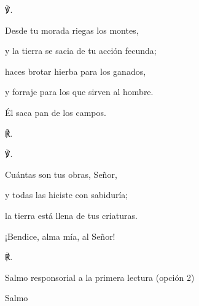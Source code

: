 			\begin{readbody}\begin{readred}℣.\end{readred} Desde tu morada riegas los montes, \end{readbody}
			
			\begin{readtabbed}y la tierra se sacia de tu acción fecunda; \end{readtabbed}
			
			\begin{readtabbed}haces brotar hierba para los ganados, \end{readtabbed}
			
			\begin{readtabbed}y forraje para los que sirven al hombre. \end{readtabbed}
			
			\begin{readtabbed}Él saca pan de los campos. \begin{readred}℟.\end{readred}\end{readtabbed}
			
			\begin{readps}\begin{readred}℣.\end{readred} Cuántas son tus obras, Señor, \end{readps}
			
			\begin{readtabbed}y todas las hiciste con sabiduría; \end{readtabbed}
			
			\begin{readtabbed}la tierra está llena de tus criaturas. \end{readtabbed}
			
			\begin{readtabbed}¡Bendice, alma mía, al Señor! \begin{readred}℟.\end{readred}\end{readtabbed}
			
			\begin{readtitle}Salmo responsorial a la primera lectura (opción 2)\end{readtitle}
			
			\begin{readbook}Salmo \end{readbook}
			
